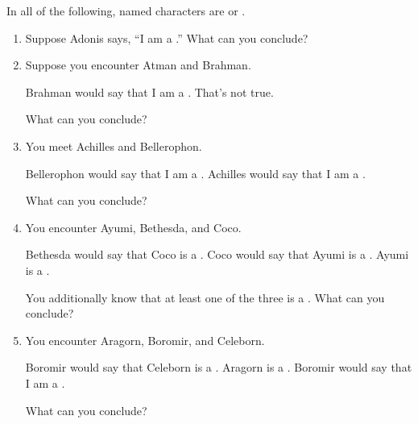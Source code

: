 \probsec{~\ref{sec:knights-knaves}}

\noindent In all of the following, named characters are \knights or \knaves.

\begin{enumerate}
    \item Suppose Adonis says, ``I am a \knight.'' What can you conclude?

    \item Suppose you encounter Atman and Brahman.
  \begin{dialogue}
     Brahman would say that I am a \knight.
     That's not true.
  \end{dialogue}
  What can you conclude?

    \item You meet Achilles and Bellerophon.
  \begin{dialogue}
     Bellerophon would say that I am a \knave.
     Achilles would say that I am a \knight.
  \end{dialogue}
  What can you conclude?

    \item You encounter Ayumi, Bethesda, and Coco.
  \begin{dialogue}
     Bethesda would say that Coco is a \knave.
     Coco would say that Ayumi is a \knave.
     Ayumi is a \knight.
  \end{dialogue} 
  You additionally know that at least one of the three is a \knight. What can you conclude?

  \item You encounter Aragorn, Boromir, and Celeborn.
  \begin{dialogue}
     Boromir would say that Celeborn is a \knave.
     Aragorn is a \knave.
     Boromir would say that I am a \knave.
  \end{dialogue}
  What can you conclude?
\end{enumerate}

